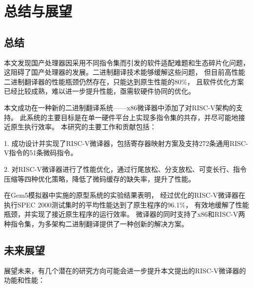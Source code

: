 \chapter{总结与展望}\label{chap:Conclusion}


\section{总结}
本文发现国产处理器因采用不同指令集而引发的软件适配难题和生态碎片化问题，
这阻碍了国产处理器的发展。二进制翻译技术能够缓解这些问题，
但目前高性能二进制翻译器的性能瓶颈仍然存在，只能达到原生性能的80\%，
且软件优化方案已经比较成熟，难以进一步提升性能，亟需软硬件协同的优化。

本文成功在一种新的二进制翻译系统——x86微译器中添加了对RISC-V架构的支持。
此系统的主要目标是在单一硬件平台上实现多指令集的共存，并尽可能地接近原生执行效率。
本研究的主要工作和贡献包括：

1. 成功设计并实现了RISC-V微译器，包括寄存器映射方案及支持272条通用RISC-V指令的51条微码指令。

2. 对RISC-V微译器进行了性能优化，通过行尾放松、分支放松、可变长行、指令压缩等四种优化策略，降低了微码缓存的缺失率，提升了性能。

在Gem5模拟器中实施的原型系统的实验结果表明，
经过优化的RISC-V微译器在执行SPEC 2000测试集时的平均性能达到了原生程序的96.1\%，
有效地缓解了性能瓶颈，并实现了接近原生程序的运行效率。
微译器的同时支持了x86和RISC-V两种指令集，为多架构二进制翻译提供了一种创新的解决方案。

\section{未来展望}

展望未来，有几个潜在的研究方向可能会进一步提升本文提出的RISC-V微译器的功能和性能：

